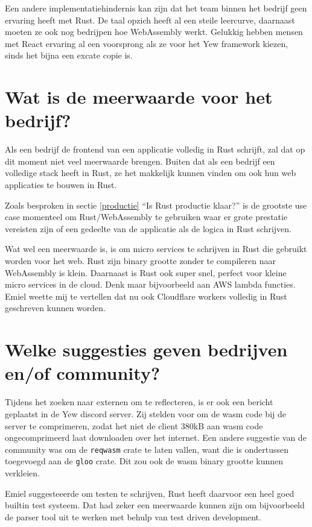 Een andere implementatiehindernis kan zijn dat het team binnen het bedrijf geen ervaring heeft met
Rust. De taal opzich heeft al een steile leercurve, daarnaast moeten ze ook nog bedrijpen hoe
WebAssembly werkt. Gelukkig hebben mensen met React ervaring al een voorsprong als ze voor het Yew
framework kiezen, sinds het bijna een excate copie is.

\section{Wat is de meerwaarde voor het bedrijf?}

Als een bedrijf de frontend van een applicatie volledig in Rust schrijft, zal dat op dit moment niet
veel meerwaarde brengen. Buiten dat als een bedrijf een volledige stack heeft in Rust, ze het
makkelijk kunnen vinden om ook hun web applicaties te bouwen in Rust. 

Zoals besproken in sectie \ref{productie} \enquote{Is Rust productie klaar?} is de grootste use case
momenteel om Rust/WebAssembly te gebruiken waar er grote prestatie vereisten zijn of een gedeelte van
de applicatie als de logica in Rust schrijven.

Wat wel een meerwaarde is, is om micro services te schrijven in Rust die gebruikt worden voor het
web. Rust zijn binary grootte zonder te compileren naar WebAssembly is klein. Daarnaast is Rust ook
super snel, perfect voor kleine micro services in de cloud. Denk maar bijvoorbeeld aan AWS lambda
functies. Emiel weette mij te vertellen dat nu ook Cloudflare workers volledig in Rust geschreven
kunnen worden. \cite{cloudflare_workers}

\section{Welke suggesties geven bedrijven en/of community?}

Tijdens het zoeken naar externen om te reflecteren, is er ook een bericht geplaatst in de Yew
discord server. Zij stelden voor om de wasm code bij de server te comprimeren, zodat het niet de
client 380kB aan wasm code ongecomprimeerd laat downloaden over het internet. Een andere suggestie
van de community was om de \texttt{reqwasm} crate te laten vallen, want die is ondertussen
toegevoegd aan de \texttt{gloo} crate. Dit zou ook de wasm binary grootte kunnen
verkleien.

Emiel suggesteeerde om testen te schrijven, Rust heeft daarvoor een heel goed builtin test systeem.
Dat had zeker een meerwaarde kunnen zijn om bijvoorbeeld de parser tool uit te werken met behulp van
test driven development.

